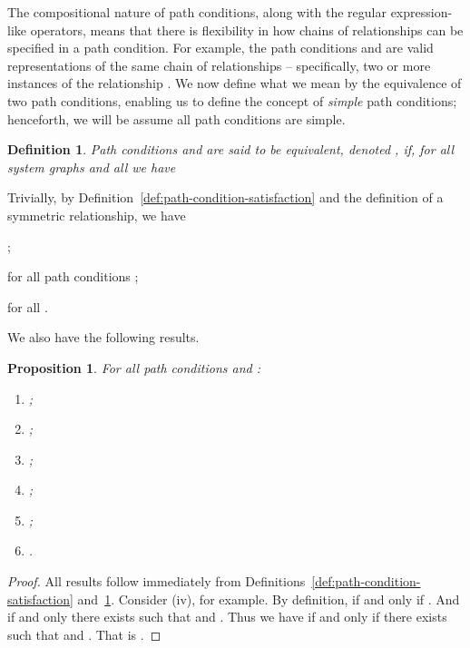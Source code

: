 \documentclass{article}
\newtheorem{definition}{Definition}
\newtheorem{proposition}{Proposition}
\begin{document}
The compositional nature of path conditions, along with the regular expression-like operators, means that there is flexibility in how chains of relationships can be specified in a path condition.
For example, the path conditions  and  are valid representations of the same chain of relationships -- specifically, two or more instances of the relationship .
We now define what we mean by the equivalence of two path conditions, enabling us to define the concept of \emph{simple} path conditions; henceforth, we will be assume all path conditions are simple.

\begin{definition}\label{def:path-condition-equivalence}Path conditions  and  are said to be \emph{equivalent}, denoted , if, for all system graphs  and all  we have
    
\end{definition}

Trivially, by Definition~\ref{def:path-condition-satisfaction} and the definition of a symmetric relationship, we have
\begin{inparaenum}[(i)]
   \item ;
    \item  for all path conditions ;
   \item  for all .
\end{inparaenum}
We also have the following results.

\begin{proposition}\label{pro:simple-equivalences}For all path conditions  and :
\begin{enumerate}[\em (i)]
        \item ;
        \item ;
        \item ;
        \item ;
        \item ;
        \item .
\end{enumerate}
\end{proposition}

\begin{proof}
    All results follow immediately from Definitions~\ref{def:path-condition-satisfaction} and~\ref{def:path-condition-equivalence}.
    Consider (iv), for example.
    By definition,  if and only if .
    And  if and only there exists  such that  and .
    Thus we have  if and only if there exists  such that  and .
    That is .
\end{proof}
\end{document}
